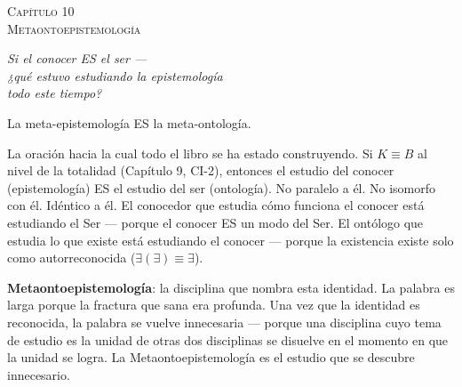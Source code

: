 \documentclass[10pt, openany, oneside]{book}
\renewcommand{\large}{\fontsize{11.5}{14}\selectfont}
\renewcommand{\huge}{\fontsize{17}{21}\selectfont}
\begin{document}
%
%
%
%

\newpage

\begin{center}
    {\huge\scshape Capítulo 10}\\[0.3em]
    {\large\scshape Metaontoepistemología}
\end{center}

\vspace{1.5em}

\begin{center}
    \itshape
    Si el conocer ES el ser ---\\
    ¿qué estuvo estudiando la epistemología\\
    todo este tiempo?
\end{center}

\vspace{2em}


\noindent La meta-epistemología ES la meta-ontología.

La oración hacia la cual todo el libro se ha estado construyendo. Si $K \equiv B$ al nivel de la totalidad (Capítulo 9, CI-2), entonces el estudio del conocer (epistemología) ES el estudio del ser (ontología). No paralelo a él. No isomorfo con él. Idéntico a él. El conocedor que estudia cómo funciona el conocer está estudiando el Ser --- porque el conocer ES un modo del Ser. El ontólogo que estudia lo que existe está estudiando el conocer --- porque la existencia existe solo como autorreconocida ($\exists(\exists) \equiv \exists$).

\textbf{Metaontoepistemología}: la disciplina que nombra esta identidad. La palabra es larga porque la fractura que sana era profunda. Una vez que la identidad es reconocida, la palabra se vuelve innecesaria --- porque una disciplina cuyo tema de estudio es la unidad de otras dos disciplinas se disuelve en el momento en que la unidad se logra. La Metaontoepistemología es el estudio que se descubre innecesario.
\end{document}
